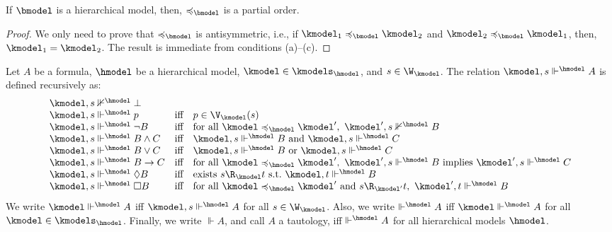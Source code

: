 \begin{proposition}
  If $\bmodel$ is a hierarchical model, then, $\preccurlyeq_{\bmodel}$ is a partial order.
\end{proposition}
\begin{proof}
  We only need to prove that $\preccurlyeq_{\bmodel}$ is antisymmetric, i.e., if $\kmodel_1 \preccurlyeq_{\bmodel} \kmodel_2$ and $\kmodel_2 \preccurlyeq_{\bmodel} \kmodel_1$, then, $\kmodel_1 = \kmodel_2$.
  The result is immediate from conditions (a)--(c).
\end{proof}

\begin{definition}\label{def:sat:imodel}
  Let $A$ be a formula, $\hmodel$ be a hierarchical model, $\kmodel \in \kmodels_{\hmodel}$, and $s \in \W_{\kmodel}$.
  The relation $\kmodel, s \Vdash^{\hmodel} A$ is defined recursively as:
  \[\begin{array}{lcl}
    \kmodel, s \nVdash^{\hmodel} \bot \\
    \kmodel, s \Vdash^{\hmodel} p & \text{iff} & p \in \V_{\kmodel}(s) \\
    \kmodel, s \Vdash^{\hmodel} \lnot B & \text{iff} & \text{for all } \kmodel \preccurlyeq_{\hmodel} \kmodel',~ \kmodel', s \nVdash^{\hmodel} B \\
    \kmodel, s \Vdash^{\hmodel} B \land C & \text{iff} & \kmodel, s \Vdash^{\hmodel} B \text{ and } \kmodel, s \Vdash^{\hmodel} C \\
    \kmodel, s \Vdash^{\hmodel} B \lor C & \text{iff} & \kmodel, s \Vdash^{\hmodel} B \text{ or } \kmodel, s \Vdash^{\hmodel} C \\
    \kmodel, s \Vdash^{\hmodel} B \to C & \text{iff} & \text{for all } \kmodel \preccurlyeq_{\hmodel} \kmodel',~ \kmodel', s \Vdash^{\hmodel} B \text{ implies } \kmodel', s \Vdash^{\hmodel} C \\
    \kmodel, s \Vdash^{\hmodel} \Diamond B & \text{iff} & \text{exists } s \R_{\kmodel} t \text{ s.t.\ } \kmodel, t \Vdash^{\hmodel} B \\
    \kmodel, s \Vdash^{\hmodel} \Box B & \text{iff} & \text{for all } \kmodel \preccurlyeq_{\hmodel} \kmodel' \text{ and } s \R_{\kmodel'} t,~ \kmodel', t \Vdash^{\hmodel} B
  \end{array}\]
  We write $\kmodel \Vdash^{\hmodel} A$ iff $\kmodel, s \Vdash^{\hmodel} A$ for all $s \in \W_{\kmodel}$.
  Also, we write $\Vdash^{\hmodel} A$ iff $\kmodel \Vdash^{\hmodel} A$ for all $\kmodel \in \kmodels_{\hmodel}$.
  Finally, we write $\Vdash A$, and call $A$ a tautology, iff $\Vdash^{\hmodel} A$ for all hierarchical models $\hmodel$.
\end{definition}

